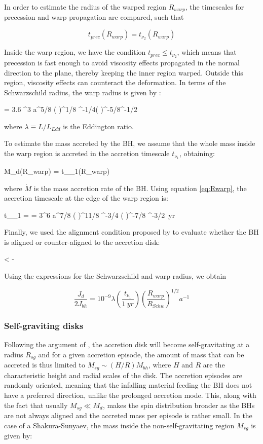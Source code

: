 \documentclass[a4,useAMS,usenatbib,usegraphicx,12pt]{article}
\begin{document}
In order to estimate the radius of the warped region $R_{warp}$, the timescales for precession and
warp propagation are compared, such that

\[ t_{prec}(R_{warp}) = t_{\nu_2}(R_{warp}) \]

Inside the warp region, we have the condition $t_{prec}\leq t_{\nu_2}$, which means that precession 
is fast enough to avoid viscosity effects propagated in the normal direction to the plane, thereby
keeping the inner region warped. Outside this region, viscosity effects can counteract the deformation.
In terms of the Schwarzschild radius, the warp radius is given by \citep{Volonteri2007}:

{  = 3.6 ^3 a^{5/8} \left(  \right)^{1/8}
\lambda^{-1/4}\left(  \right)^{-5/8}\alpha^{-1/2} }

where $\lambda \equiv L/L_{Edd}$ is the Eddington ratio.

To estimate the mass accreted by the BH, we assume that the whole mass inside the warp region is 
accreted in the accretion timescale $t_{\nu_1}$, obtaining:

{ M_d(R_{warp}) =  t_{\nu_1}(R_{warp}) }

where $\dot{M}$ is the mass accretion rate of the BH. Using equation \ref{eq:Rwarp}, the accretion 
timescale at the edge of the warp region is:

{ t_{\nu_1} =  = 3^6 a^{7/8} \left(  \right)^{11/8}
\lambda^{-3/4} \left(  \right)^{-7/8} \alpha^{-3/2}\ yr  }

Finally, we used the alignment condition proposed by \citet{King2005} to evaluate whether the BH is 
aligned or counter-aligned to the accretion disk:

{ \cos \theta < - }

Using the expressions for the Schwarzschild and warp radius, we obtain

\[ \frac{J_d}{2J_{bh}} = 10^{-9} \lambda \left( \frac{t_{\nu_1}}{1\ yr} \right) \left( \frac{R_{warp}}{R_{Schw}} \right)^{1/2}
a^{-1}\]

\subsubsection{Self-graviting disks}

Following the argument of \citet{King2008}, the accretion disk will become self-gravitating at a
radius $R_{sg}$ and for a given accretion episode, the amount of mass that can be accreted is thus 
limited to $M_{sg} \sim (H/R) M_{bh}$, where $H$ and $R$ are the characteristic height and radial 
scales of the disk. The accretion episodes are randomly oriented, meaning that the infalling 
material feeding the BH does not have a preferred direction, unlike the prolonged accretion mode. 
This, along with the fact that usually $M_{sg}\ll M_d$, makes the spin distribution broader as the 
BHs are not always aligned and the accreted mass per episode is rather small. In the case of a 
Shakura-Sunyaev, the mass inside the non-self-gravitating region $M_{sg}$ is given by:
\end{document}
